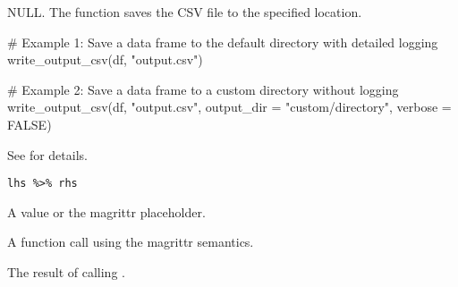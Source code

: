 \documentclass[a4paper]{book}
\begin{document}
%
\begin{Value}
NULL. The function saves the CSV file to the specified location.
\end{Value}
%
\begin{Examples}
\begin{ExampleCode}
# Example 1: Save a data frame to the default directory with detailed logging
write_output_csv(df, "output.csv")

# Example 2: Save a data frame to a custom directory without logging
write_output_csv(df, "output.csv", output_dir = "custom/directory", verbose = FALSE)

\end{ExampleCode}
\end{Examples}
%
\begin{Description}
See  for details.
\end{Description}
%
\begin{Usage}
\begin{verbatim}
lhs %>% rhs
\end{verbatim}
\end{Usage}
%
\begin{Arguments}
\begin{ldescription}
\item[\code{lhs}] A value or the magrittr placeholder.

\item[\code{rhs}] A function call using the magrittr semantics.
\end{ldescription}
\end{Arguments}
%
\begin{Value}
The result of calling .
\end{Value}
\printindex{}
\end{document}
